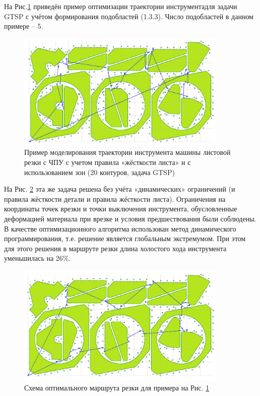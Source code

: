 \documentclass{article}
\begin{document}
На Рис.\ref{zones-a}
приведён пример оптимизации траектории
инструментадля задачи GTSP с учётом
формирования подобластей  (1.3.3).
Число подобластей в данном примере – 5.

\begin{figure}
  \begin{center}
  \includegraphics[width=0.9\textwidth]{zones-a.png}
  \caption{Пример моделирования траектории инструмента машины листовой резки с ЧПУ
    с учетом правила «жёсткости листа» и с использованием зон (20 контуров, задача GTSP)}
  \label{zones-a}
  \end{center}
\end{figure}

На Рис. \ref{zones-b}
эта же задача решена без учёта
«динамических» ограничений
(и правила жёсткости детали и правила жёсткости листа).
Ограничения на координаты точек врезки и
точки выключения инструмента,
обусловленные деформацией материала при врезке и
условия предшествования были соблюдены.
В качестве оптимизационного алгоритма
использован метод динамического программирования,
т.е. решение является глобальным экстремумом.
При этом для этого решения в маршруте резки
длина холостого хода инструмента уменьшилась на 26\%.

\begin{figure}
  \begin{center}
  \includegraphics[width=0.9\textwidth]{zones-b.png}
  \caption{Схема оптимального маршрута резки для примера на Рис. \ref{zones-a}}
  \label{zones-b}
  \end{center}
\end{figure}
\end{document}
